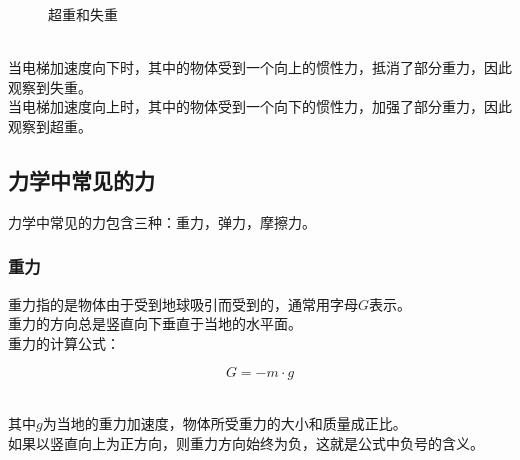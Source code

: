 \documentclass[UTF8]{ctexart}
\begin{document}
\begin{figure}[h]
\begin{center}
{
            }
            \caption{超重和失重}
        \end{center}
    \end{figure}\\
    当电梯加速度向下时，其中的物体受到一个向上的惯性力，抵消了部分重力，因此观察到失重。\\[3mm]
    当电梯加速度向上时，其中的物体受到一个向下的惯性力，加强了部分重力，因此观察到超重。

\newpage

\subsection{力学中常见的力}
    力学中常见的力包含三种：重力，弹力，摩擦力。

\subsubsection{重力}
    重力指的是物体由于受到地球吸引而受到的，通常用字母$G$表示。\\[3mm]
    重力的方向总是竖直向下垂直于当地的水平面。\\[3mm]
    重力的计算公式：
    \begin{large}
        \begin{equation*}
            G=-m\cdot g
        \end{equation*}
    \end{large}\\
    其中$g$为当地的重力加速度，物体所受重力的大小和质量成正比。\\[3mm]
    如果以竖直向上为正方向，则重力方向始终为负，这就是公式中负号的含义。\\
\end{document}
